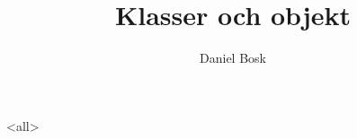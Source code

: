\documentclass[ignoreframetext]{beamer}
\begin{document}
\title{%
  Klasser och objekt
}
\author{Daniel Bosk}

\begin{frame}
  \maketitle
\end{frame}

\mode<all>

\mode*
\end{document}
